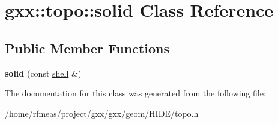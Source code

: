 \hypertarget{classgxx_1_1topo_1_1solid}{}\section{gxx\+:\+:topo\+:\+:solid Class Reference}
\label{classgxx_1_1topo_1_1solid}
\subsection*{Public Member Functions}
\begin{DoxyCompactItemize}
\item 
{\bfseries solid} (const \hyperlink{classgxx_1_1topo_1_1shell}{shell} \&)\hypertarget{classgxx_1_1topo_1_1solid_a303569b534c40797f19eb332eb113b55}{}\label{classgxx_1_1topo_1_1solid_a303569b534c40797f19eb332eb113b55}

\end{DoxyCompactItemize}


The documentation for this class was generated from the following file\+:\begin{DoxyCompactItemize}
\item 
/home/rfmeas/project/gxx/gxx/geom/\+H\+I\+D\+E/topo.\+h\end{DoxyCompactItemize}
